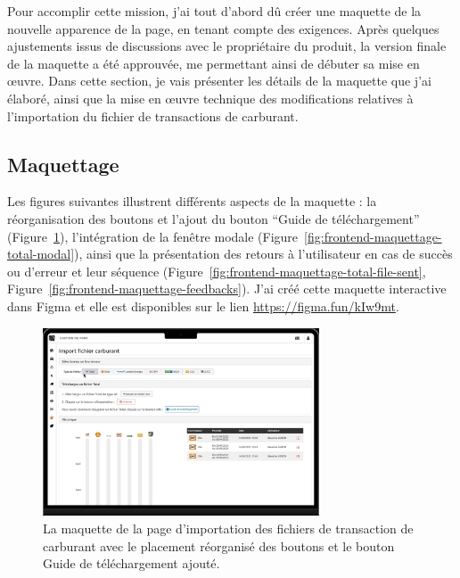 Pour accomplir cette mission, j'ai tout d'abord dû créer une maquette de la nouvelle apparence de la page, en tenant compte des exigences. Après quelques ajustements issus de discussions avec le propriétaire du produit, la version finale de la maquette a été approuvée, me permettant ainsi de débuter sa mise en œuvre. Dans cette section, je vais présenter les détails de la maquette que j'ai élaboré, ainsi que la mise en œuvre technique des modifications relatives à l'importation du fichier de transactions de carburant.

\subsection{Maquettage}

Les figures suivantes illustrent différents aspects de la maquette : la réorganisation des boutons et l'ajout du bouton \foreignquote{french}{Guide de téléchargement} (Figure~\ref{fig:frontend-maquettage-total-buttons}), l'intégration de la fenêtre modale (Figure~\ref{fig:frontend-maquettage-total-modal}), ainsi que la présentation des retours à l'utilisateur en cas de succès ou d'erreur et leur séquence (Figure~\ref{fig:frontend-maquettage-total-file-sent}, Figure~\ref{fig:frontend-maquettage-feedbacks}). J'ai créé cette maquette interactive dans Figma et elle est disponibles sur le lien \url{https://figma.fun/kIw9mt}.

\begin{figure}[ht]
    \centering
    \includegraphics[width=0.73\textwidth]{img/frontend-maquettage-total-buttons}
    \caption{La maquette de la page d'importation des fichiers de transaction de carburant avec le placement réorganisé des boutons et le bouton Guide de téléchargement ajouté.}
    \label{fig:frontend-maquettage-total-buttons}
\end{figure}

